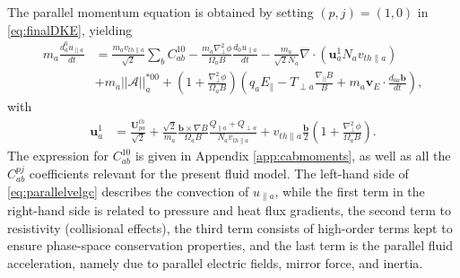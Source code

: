{{The parallel momentum equation is obtained by setting $(p,j)=(1,0)$ in \cref{eq:finalDKE}, yielding
%
\begin{equation}
    \begin{split}
        m_a\frac{d_a^0 u_{\parallel a}}{dt} &=\frac{m_a v_{th\parallel a}}{\sqrt 2}\sum_b C_{ab}^{10}-\frac{m_a \nabla_\perp^2 \phi}{\Omega_a B}\frac{d_0 u_{\parallel a}}{dt} - \frac{m_a}{\sqrt 2N_a}\nabla \cdot\left(\mathbf u_a^1 N_a v_{th\parallel a} \right) \\
        &+m_a ||\mathcal{A}||_a^{*00}+\left(1+\frac{\nabla_\perp^2 \phi}{\Omega_a B}\right)\left(q_a E_\parallel - T_{\perp a} \frac{\nabla_\parallel B}{B}+m_a \mathbf v_E \cdot \frac{d_{0 a} \mathbf b}{dt}\right),
    \end{split}
    \label{eq:parallelvelgc}
\end{equation}
%
with 
%
\begin{equation}
    \begin{split}
        \mathbf u_a^1 &= \frac{\mathbf U_{p a}^{th}}{\sqrt{2}}+\frac{\sqrt 2}{m_a}\frac{\mathbf b \times \nabla B}{\Omega_a B}\frac{Q_{\parallel a}+Q_{\perp a}}{N_a v_{th\parallel a}}+v_{th\parallel a}\frac{\mathbf b}{2}\left(1+\frac{\nabla_\perp^2 \phi}{\Omega_a B}\right).
    \end{split}
\end{equation}
%
The expression for $C_{ab}^{10}$ is given in Appendix \ref{app:cabmoments}, as well as all the $C_{ab}^{pj}$ coefficients relevant for the present fluid model.
The left-hand side of \cref{eq:parallelvelgc} describes the convection of $u_{\parallel a}$, while the first term in the right-hand side is related to pressure and heat flux gradients, the second term to resistivity (collisional effects), the third term consists of high-order terms kept to ensure phase-space conservation properties, and the last term is the parallel fluid acceleration, namely due to parallel electric fields, mirror force, and inertia.

}}

